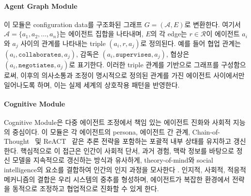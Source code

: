 \paragraph{Agent Graph Module}
이 모듈은 configuration data를 구조화된 그래프 \(G = (\mathcal{A}, E)\)로 변환한다. 여기서 \(\mathcal{A} = \{a_1, a_2, \dots, a_n\}\)는 에이전트 집합을 나타내며, \(E\)의 각 edge는 \(r \in \mathcal{R}\)이 에이전트 \(a_i\)와 \(a_j\) 사이의 관계를 나타내는 triple \((a_i, r, a_j)\)로 정의된다. 예를 들어 협업 관계는 \((a_i, \texttt{collaborates}, a_j)\), 감독은 \((a_i, \texttt{supervises}, a_j)\), 협상은 \((a_i, \texttt{negotiates}, a_j)\)로 표기한다. 이러한 triple 관계를 기반으로 그래프를 구성함으로써, 이후의 의사소통과 조정이 명시적으로 정의된 관계를 가진 에이전트 사이에서만 일어나도록 하며, 이는 실제 세계의 상호작용 패턴을 반영한다.



\paragraph{Cognitive Module}
Cognitive Module은 다중 에이전트 조정에서 책임 있는 에이전트 진화와 사회적 지능의 중심이다. 이 모듈은 각 에이전트의 persona, 에이전트 간 관계, Chain-of-Thought~\citep{wei2023chainofthoughtpromptingelicitsreasoning} 및 ReACT~\citep{yao2023reactsynergizingreasoningacting} 같은 추론 전략을 포함하는 포괄적 내부 상태를 유지하고 갱신한다. 핵심적으로 이 접근은 인간이 사회적 단서, 과거 경험, 맥락 정보를 바탕으로 정신 모델을 지속적으로 갱신하는 방식과 유사하게, theory-of-mind와 social intelligence의 요소를 결합하여 인간의 인지 과정을 모사한다 \citep[e.g.,][]{premack1978}. 인지적, 사회적, 적응적 메커니즘의 결합은 우리 시스템의 중추를 형성하며, 에이전트가 복잡한 환경에서 전략을 동적으로 조정하고 협업적으로 진화할 수 있게 한다.


